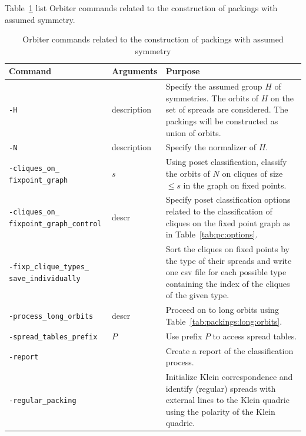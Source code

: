 \bigskip


Table~\ref{tab:packings:was} list Orbiter commands related 
to the construction of packings with assumed symmetry.
\begin{table}
\begin{center}
\begin{tabular}{|p{5cm}|p{2cm}|p{7cm}|}
\hline
Command & Arguments & Purpose \\
\hline
\verb'-H' & description   & 
Specify the assumed group $H$ of symmetries. 
The orbits of $H$ on the set of spreads are considered. 
The packings will be constructed as union of orbits. \\
\hline
\verb'-N' & description   & Specify the normalizer of $H$.\\
\hline
\verb'-cliques_on_' \verb'fixpoint_graph' &  $s$  & 
Using poset classification, 
classify the orbits of $N$ on cliques of size $\le s$ in the graph on fixed points. \\
\hline
\verb'-cliques_on_' \verb'fixpoint_graph_control' &  descr  & 
Specify poset classification options related to the classification 
of cliques on the fixed point graph as in Table~\ref{tab:pc:options}. \\
\hline
\verb'-fixp_clique_types_' \verb'save_individually' &    & 
Sort the cliques on fixed points by the type 
of their spreads and write one csv file for each possible 
type containing the index of the cliques of the given type.  \\
\hline
\verb'-process_long_orbits' &  descr  & 
Proceed on to long orbits using Table~\ref{tab:packings:long:orbits}. \\
\hline
\verb'-spread_tables_prefix' &  $P$  &  Use prefix $P$ to access spread tables. \\
\hline
\verb'-report' &    & Create a report of the classification process. \\
\hline
\verb'-regular_packing' &    &  
Initialize Klein correspondence and identify (regular) 
spreads with external lines to the Klein quadric 
using the polarity of the Klein quadric. \\
\hline
\end{tabular}
\end{center}
\caption{\label{tab:packings:was}Orbiter commands related to the 
construction of packings with assumed symmetry}
\end{table}

